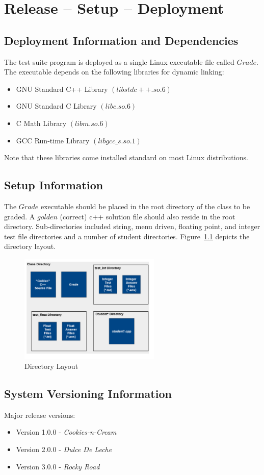 
\chapter{Release -- Setup -- Deployment}

\section{Deployment Information and Dependencies}
The test suite program is deployed as a single Linux executable file called $Grade$. The executable depends on the following libraries for dynamic linking:

\begin{itemize}
	\item GNU Standard C++ Library $(libstdc++.so.6)$
	\item GNU Standard C Library $(libc.so.6)$
	\item C Math Library $(libm.so.6)$
	\item GCC Run-time Library $(libgcc\_s.so.1)$
\end{itemize}

\noindent Note that these libraries come installed standard on most Linux distributions.


\section{Setup Information}
The $Grade$ executable should be placed in the root directory of the class to be graded. A $golden$ (correct) c++ solution file should also reside in the root directory. Sub-directories included string, menu driven, floating point, and integer test file directories and a number of student directories.
Figure~\ref{directorylayout} depicts the directory layout.
\begin{figure}[H]
\begin{center}
\includegraphics[width=0.6\textwidth]{./directorylayout}
\end{center}
\caption{Directory Layout \label{directorylayout}}
\end{figure}


\section{System  Versioning Information}
Major release versions:
\begin{itemize}
	\item Version 1.0.0 - {\it Cookies-n-Cream}
	\item Version 2.0.0 - {\it Dulce De Leche}
	\item Version 3.0.0 - {\it Rocky Road}
\end{itemize}
